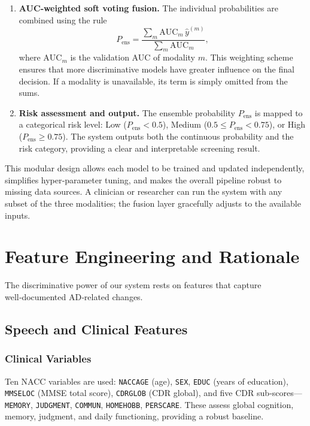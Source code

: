 \documentclass[conference]{IEEEtran}
\begin{document}
\begin{enumerate}[leftmargin=*, itemsep=3pt]
  \item \textbf{AUC‑weighted soft voting fusion.} The individual probabilities are combined using the rule
  \[
  P_{\mathrm{ens}} = \frac{\sum_{m} \mathrm{AUC}_m \, \hat{y}^{(m)}}{\sum_{m} \mathrm{AUC}_m},
  \]
  where $\mathrm{AUC}_m$ is the validation AUC of modality $m$. This weighting scheme ensures that more discriminative models have greater influence on the final decision. If a modality is unavailable, its term is simply omitted from the sums.
  \item \textbf{Risk assessment and output.} The ensemble probability $P_{\mathrm{ens}}$ is mapped to a categorical risk level: Low ($P_{\mathrm{ens}} < 0.5$), Medium ($0.5 \le P_{\mathrm{ens}} < 0.75$), or High ($P_{\mathrm{ens}} \ge 0.75$). The system outputs both the continuous probability and the risk category, providing a clear and interpretable screening result.
\end{enumerate}

This modular design allows each model to be trained and updated independently, simplifies hyper‑parameter tuning, and makes the overall pipeline robust to missing data sources. A clinician or researcher can run the system with any subset of the three modalities; the fusion layer gracefully adjusts to the available inputs.
\section{Feature Engineering and Rationale}
The discriminative power of our system rests on features that capture well‑documented AD‑related changes.

\subsection{Speech and Clinical Features}
\subsubsection*{Clinical Variables}
Ten NACC variables are used: \texttt{NACCAGE} (age), \texttt{SEX}, \texttt{EDUC} (years of education), \texttt{MMSELOC} (MMSE total score), \texttt{CDRGLOB} (CDR global), and five CDR sub‑scores—\texttt{MEMORY}, \texttt{JUDGMENT}, \texttt{COMMUN}, \texttt{HOMEHOBB}, \texttt{PERSCARE}. These assess global cognition, memory, judgment, and daily functioning, providing a robust baseline.
\end{document}
